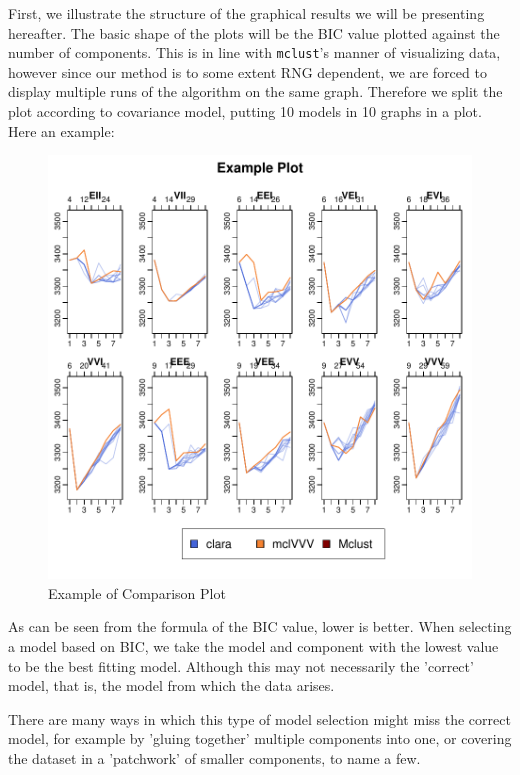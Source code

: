 First, we illustrate the structure of the graphical results we will be 
presenting hereafter. The basic shape of the plots will be the BIC value 
plotted against the number of components. This is in line with {\tt mclust}'s
manner of visualizing data, however since our method is to some extent RNG 
dependent, we are forced to display multiple runs of the algorithm on the same
graph. Therefore we split the plot according to covariance model, putting 10
models in 10 graphs in a plot. Here an example:


\begin{figure}
    \centering
\includegraphics{chapter3-bicplotdemoplot}
    \caption{Example of Comparison Plot}
    \label{fig:ExPlot}
\end{figure}

As can be seen from the formula of the BIC value, lower is better. When 
selecting a model based on BIC, we take the model and component with the 
lowest value to be the best fitting model. Although this may not necessarily
the 'correct' model, that is, the model from which the data arises.

There are many ways in which this type of model selection might miss the 
correct model, for example by 'gluing together' multiple components into one,
or covering the dataset in a 'patchwork' of smaller components, to name a few.

